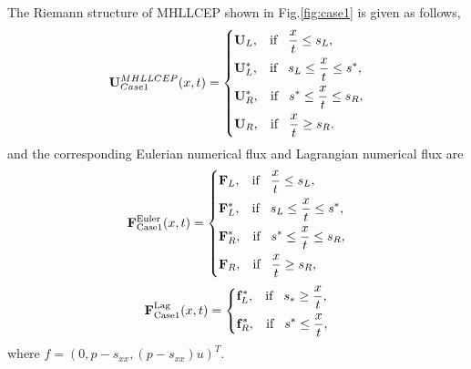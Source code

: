 \documentclass[review]{elsarticle}
\begin{document}
The Riemann structure of MHLLCEP  shown in Fig.\ref{fig:case1} is given as follows,
\begin{equation}\label{eq:HLLCEP}
  \mathbf{U}^{{MHLLCEP}}_{{Case1}}(x,t) = \left\{ \begin{aligned}
        & \mathbf{U}_L, \hspace{0.3cm} \text{if} \hspace{0.3cm} \frac{x}{t}\le s_L, \\
        & \mathbf{U}_L^*, \hspace{0.3cm} \text{if} \hspace{0.3cm} s_L\le \frac{x}{t} \le s^*, \\
        & \mathbf{U}_R^*, \hspace{0.3cm} \text{if} \hspace{0.3cm} s^*\le \frac{x}{t} \le s_R,\\
        & \mathbf{U}_R, \hspace{0.3cm} \text{if} \hspace{0.3cm} \frac{x}{t}\ge s_R. \\
      \end{aligned}
    \right.
  \end{equation}
  and the corresponding Eulerian numerical flux and Lagrangian numerical flux are
 \begin{equation}
    \mathbf{F}^{\text{Euler}}_{\text{Case1}}(x,t) = \left\{ \begin{aligned}
        & \mathbf{F}_L, \hspace{0.3cm} \text{if} \hspace{0.3cm} \frac{x}{t}\le s_L, \\
        & \mathbf{F}_L^*, \hspace{0.3cm} \text{if} \hspace{0.3cm} s_L\le \frac{x}{t} \le s^*, \\
        & \mathbf{F}_R^*, \hspace{0.3cm} \text{if} \hspace{0.3cm} s^*\le \frac{x}{t} \le s_R,\\
        & \mathbf{F}_R, \hspace{0.3cm} \text{if} \hspace{0.3cm} \frac{x}{t}\ge s_R, \\
      \end{aligned}
    \right.
  \end{equation}
\begin{equation}
    \mathbf{F}^{\text{Lag}}_{\text{Case1}}(x,t) = \left\{ \begin{aligned}
        & \mathbf{f}_L^*, \hspace{0.3cm} \text{if} \hspace{0.3cm} s_*\ge \frac{x}{t},\\
        & \mathbf{f}_R^*, \hspace{0.3cm} \text{if} \hspace{0.3cm} s^*\le \frac{x}{t},\\
      \end{aligned}
    \right.
  \end{equation}
where $f=(0,p-s_{xx},(p-s_{xx})u)^{T}$.
\end{document}
